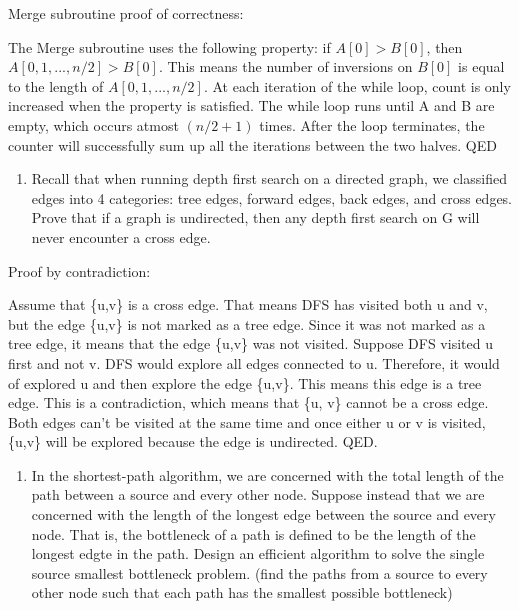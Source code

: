 \documentclass[11pt]{article}
\providecommand{\tightlist}{%
      \setlength{\itemsep}{0pt}\setlength{\parskip}{0pt}}
\begin{document}
Merge subroutine proof of correctness:

The Merge subroutine uses the following property: if \(A[0] > B[0]\),
then \(A[0, 1, ..., n/2] > B[0]\). This means the number of inversions
on \(B[0]\) is equal to the length of \(A[0, 1, ..., n/2]\). At each
iteration of the while loop, count is only increased when the property
is satisfied. The while loop runs until A and B are empty, which occurs
atmost \((n/2+1)\) times. After the loop terminates, the counter will
successfully sum up all the iterations between the two halves. QED

    \begin{enumerate}
\def\labelenumi{\arabic{enumi}.}
\setcounter{enumi}{3}
\tightlist
\item
  Recall that when running depth first search on a directed graph, we
  classified edges into 4 categories: tree edges, forward edges, back
  edges, and cross edges. Prove that if a graph is undirected, then any
  depth first search on G will never encounter a cross edge.
\end{enumerate}

    Proof by contradiction:

Assume that \{u,v\} is a cross edge. That means DFS has visited both u
and v, but the edge \{u,v\} is not marked as a tree edge. Since it was
not marked as a tree edge, it means that the edge \{u,v\} was not
visited. Suppose DFS visited u first and not v. DFS would explore all
edges connected to u. Therefore, it would of explored u and then explore
the edge \{u,v\}. This means this edge is a tree edge. This is a
contradiction, which means that \{u, v\} cannot be a cross edge. Both
edges can't be visited at the same time and once either u or v is
visited, \{u,v\} will be explored because the edge is undirected. QED.

    \begin{enumerate}
\def\labelenumi{\arabic{enumi}.}
\setcounter{enumi}{4}
\tightlist
\item
  In the shortest-path algorithm, we are concerned with the total length
  of the path between a source and every other node. Suppose instead
  that we are concerned with the length of the longest edge between the
  source and every node. That is, the bottleneck of a path is defined to
  be the length of the longest edgte in the path. Design an efficient
  algorithm to solve the single source smallest bottleneck problem.
  (find the paths from a source to every other node such that each path
  has the smallest possible bottleneck)
\end{enumerate}
\end{document}

